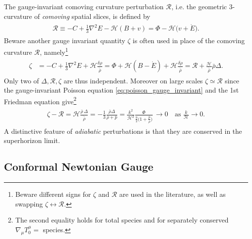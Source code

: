 The gauge-invariant comoving curvature perturbation $\mathcal{R}$, i.e. the geometric 3-curvature of \emph{comoving} spatial slices, is defined by
\begin{align}\label{eq:comoving_curvature_perturbations_gauge_inv_and_newtonian}
\begin{aligned}
    \mathcal{R}\equiv -C+\tfrac13\nabla^2E-\mathcal{H}(B+v) = \Phi -\mathcal{H}\big(v+\dot{E}\big).
\end{aligned}
\end{align}
Beware another gauge invariant quantity $\zeta$ is often used in place of the comoving curvature $\mathcal{R}$, namely\footnote{Beware different signs for $\zeta$ and $\mathcal{R}$ are used in the literature, as well as swapping $\zeta\leftrightarrow\mathcal{R}$.}
{\small\begin{align}
\begin{aligned}
    \zeta & =-C+\frac{1}{3} \nabla^{2} E+\mathcal{H} \frac{\delta \rho}{\dot{\bar{\rho}}} = \Phi +\mathcal{H}(B-\dot{E})+ \mathcal{H}\frac{\delta \rho}{\dot{\bar{\rho}}} = \mathcal{R}+\frac{\mathcal{H}}{\dot{\bar{\rho}}} \bar{\rho} \Delta.
\end{aligned}
\end{align}}
Only two of $\Delta, \mathcal{R}, \zeta$ are thus independent.
Moreover on large scales $\zeta \simeq \mathcal{R}$ since the gauge-invariant Poisson equation \eqref{eq:poisson_gauge_invariant} and the 1st Friedman equation give\footnote{The second equality holds for total species and for separately conserved $\nabla_\mu T^\mu_0=$ species.}
{\small
\begin{align}
\begin{aligned}
    \zeta-\mathcal{R}=\mathcal{H}\frac{\bar{\rho}\, \Delta }{\dot{\bar{\rho}}}
    = -\tfrac13 \frac{\bar{\rho}\Delta}{\bar{\rho}+\bar{p}}
    =\frac{k^2}{\mathcal{H}^2}\frac{\Phi}{\tfrac92 \Big(1+\frac{\bar{p}}{\bar{\rho}}\Big)}
    \,\to 0\quad\text{as}\,\,\frac{k}{\mathcal{H}}\to0.
\end{aligned}
\end{align}}
A distinctive feature of \emph{adiabatic} perturbations is that they are conserved in the superhorizon limit.




\subsection{Conformal Newtonian Gauge}

